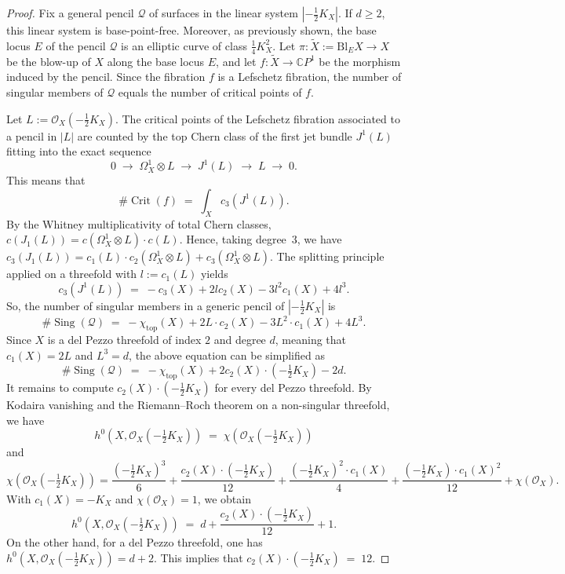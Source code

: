 \documentclass[11pt]{amsart}
\numberwithin{equation}{section}
\theoremstyle{definition}
\theoremstyle{plain}
\theoremstyle{remark}
\DeclareMathOperator{\Crit}{Crit}
\DeclareMathOperator{\Sing}{Sing}
\begin{document}
\begin{proof}
 Fix  a general pencil $\mathcal{Q}$ of surfaces in the linear system $|-\frac{1}{2}K_X|$. If $d\ge 2$, this linear system  is base-point-free.  Moreover, as previously shown, the base locus $E$ of the pencil $\mathcal{Q}$ is an elliptic curve of class $\frac{1}{4}K_X^2$. Let $\pi\colon \widetilde X:=\mathrm{Bl}_E X\to X$ be the blow-up of $X$ along the base locus $E$, and let
$f\colon \widetilde X\to\mathbb{C} P^1$ be the morphism induced by the pencil. Since the fibration $f$ is a Lefschetz fibration, the number of singular members of $\mathcal{Q}$ equals the number of critical points of $f$.

Let $L:=\mathcal O_X(-\frac{1}{2}K_X)$. The critical points of the Lefschetz fibration associated to a pencil in
$|L|$ are counted by the top Chern class of the first jet bundle $J^1(L)$ fitting into the exact sequence
\[
0 \;\longrightarrow\; \Omega_X^1 \otimes L \;\longrightarrow\; J^1(L) \;\longrightarrow\; L \;\longrightarrow\; 0.
\]
This means that
\[
\#\Crit(f)\;=\;\int_X c_3\left(J^1(L)\right).
\]
By the Whitney multiplicativity of total Chern classes, $c(J_1(L))=c(\Omega_X^1\otimes L)\cdot c(L)$. Hence, taking degree~$3$, we have $c_3(J_1(L))=c_1(L)\cdot c_2(\Omega_X^1\otimes L)+c_3(\Omega_X^1\otimes L)$.
The splitting principle applied on a threefold with $l:=c_1(L)$ yields
\[
c_3\left(J^1(L)\right)
\;=\;-c_3(X)+2lc_2(X)-3l^2c_1(X)+4l^3.
\]
So, the number of singular members in a generic pencil of $|-\frac{1}{2}K_X|$ is
\begin{equation*}
\#\Sing(\mathcal{Q})\;=\;-\chi_\mathrm{top}(X)+2L\cdot c_2(X)-3L^2\cdot c_1(X)+4L^3.
\end{equation*}
Since $X$ is a del Pezzo threefold of index $2$ and degree $d$, meaning that $c_1(X)=2L$ and $L^3=d$, the above equation can be simplified as
\begin{equation}\label{eq:discriminant}
\#\Sing(\mathcal{Q})\;=\;-\chi_\mathrm{top}(X)+2c_2(X)\cdot  \left(-\tfrac{1}{2}K_X\right)-2d.
\end{equation}
It remains to compute $c_2(X)\cdot (-\frac{1}{2}K_X)$ for every del Pezzo threefold. By Kodaira vanishing and the Riemann--Roch theorem on a  non-singular threefold, we have 
\[
h^0\left(X,\mathcal O_X\left(-\tfrac{1}{2}K_X\right)\right)\;=\;\chi\left(\mathcal O_X\left(-\tfrac{1}{2}K_X\right)\right)
\]
and
\[
\chi\left(\mathcal O_X\left(-\tfrac{1}{2}K_X\right)\right)
= \frac{\left(-\frac{1}{2}K_X\right)^3}{6}+\frac{c_2(X)\cdot \left(-\frac{1}{2}K_X\right)}{12}+\frac{\left(-\frac{1}{2}K_X\right)^2\cdot c_1(X)}{4}
+\frac{\left(-\frac{1}{2}K_X\right)\cdot c_1(X)^2}{12}+\chi(\mathcal O_X).
\]
With $c_1(X)=-K_X$ and $\chi(\mathcal O_X)=1$, we obtain
\[
h^0\left(X,\mathcal O_X\left(-\tfrac{1}{2}K_X\right)\right)\;=\; d + \frac{c_2(X)\cdot \left(-\frac{1}{2}K_X\right)}{12} + 1.
\]
On the other hand, for a del Pezzo threefold, one has $h^0(X,\mathcal O_X(-\frac{1}{2}K_X))=d+2$. This implies that $c_2(X)\cdot (-\frac{1}{2}K_X) \;=\; 12$.


\end{proof}
\end{document}
